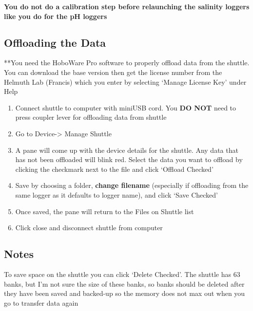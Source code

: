 \documentclass[
  letterpaper,
  DIV=11,
  numbers=noendperiod]{scrreprt}
\begin{document}
\textbf{You do not do a calibration step before relaunching the salinity
loggers like you do for the pH loggers}

\hypertarget{offloading-the-data}{%
\subsection*{\texorpdfstring{\textbf{Offloading the
Data}}{Offloading the Data}}\label{offloading-the-data}}

**You need the HoboWare Pro software to properly offload data from the
shuttle. You can download the base version then get the license number
from the Helmuth Lab (Francis) which you enter by selecting `Manage
License Key' under Help

\begin{enumerate}
\def\labelenumi{\arabic{enumi}.}
\item
  Connect shuttle to computer with miniUSB cord. You \textbf{DO NOT}
  need to press coupler lever for offloading data from shuttle
\item
  Go to Device-\textgreater{} Manage Shuttle
\item
  A pane will come up with the device details for the shuttle. Any data
  that has not been offloaded will blink red. Select the data you want
  to offload by clicking the checkmark next to the file and click
  `Offload Checked'
\item
  Save by choosing a folder, \textbf{change filename} (especially if
  offloading from the same logger as it defaults to logger name), and
  click `Save Checked'
\item
  Once saved, the pane will return to the Files on Shuttle list
\item
  Click close and disconnect shuttle from computer
\end{enumerate}

\hypertarget{notes-3}{%
\subsection*{\texorpdfstring{\textbf{Notes}}{Notes}}\label{notes-3}}

To save space on the shuttle you can click `Delete Checked'. The shuttle
has 63 banks, but I'm not sure the size of these banks, so banks should
be deleted after they have been saved and backed-up so the memory does
not max out when you go to transfer data again
\end{document}
